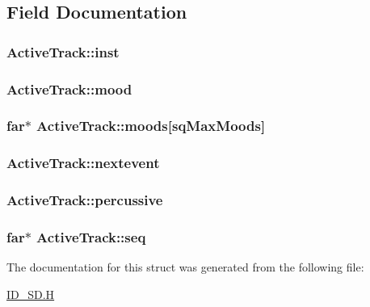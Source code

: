 \subsection{Field Documentation}
\hypertarget{structActiveTrack_a2cc1d1ef0b29c5397a1ed9e631517456}{
\subsubsection[{inst}]{ {\bf ActiveTrack::inst}}}
\label{structActiveTrack_a2cc1d1ef0b29c5397a1ed9e631517456}
\hypertarget{structActiveTrack_aaba9b7709da3346226478f057ee65c48}{
\subsubsection[{mood}]{ {\bf ActiveTrack::mood}}}
\label{structActiveTrack_aaba9b7709da3346226478f057ee65c48}
\hypertarget{structActiveTrack_a60ead5579aeb16b38995eefb9990913c}{
\subsubsection[{moods}]{ far$\ast$ {\bf ActiveTrack::moods}\mbox{[}sqMaxMoods\mbox{]}}}
\label{structActiveTrack_a60ead5579aeb16b38995eefb9990913c}
\hypertarget{structActiveTrack_a5f40ea505c14c688124600762ff101f4}{
\subsubsection[{nextevent}]{ {\bf ActiveTrack::nextevent}}}
\label{structActiveTrack_a5f40ea505c14c688124600762ff101f4}
\hypertarget{structActiveTrack_ad0f5656b9be0982f70f033ef383ec7aa}{
\subsubsection[{percussive}]{ {\bf ActiveTrack::percussive}}}
\label{structActiveTrack_ad0f5656b9be0982f70f033ef383ec7aa}
\hypertarget{structActiveTrack_a37559e9209b8049a20b0d508ec18b4e5}{
\subsubsection[{seq}]{ far$\ast$ {\bf ActiveTrack::seq}}}
\label{structActiveTrack_a37559e9209b8049a20b0d508ec18b4e5}


The documentation for this struct was generated from the following file:\begin{DoxyCompactItemize}
\item 
\hyperlink{ID__SD_8H}{ID\_\-SD.H}\end{DoxyCompactItemize}
